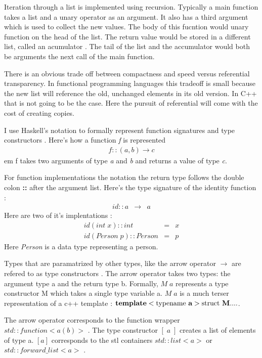 \documentclass[12pt,fleqn]{article}
\begin{document}
Iteration through a list is implemented using recursion.
Typically a main function takes a list and a unary operator as an argument. 
It also has a third argument which is used to collect the new values.
The body of this fucntion would unary function on the head of the list.
The return value would be stored in a different list, called an acumulator \cite{hutton}.
The tail of the list and the accumulator would both be arguments the next call of the main function. 

There is an obvious trade off between compactness and speed versus referential transparency.
In functional programming languages this tradeoff is small because the new list will reference the old, unchanged elements in its old version.
In C++ that is not going to be the case.  Here the pursuit of referential will come with the cost of creating copies. 

I use Haskell's notation to formally represent function signatures and type constructors \cite{hutton}. 
Here's how a function {\em f} is represented  
\begin{eqnarray*}
                              f::(a,b) \rightarrow c
\end{eqnarray*}
{em f} takes two arguments of type {\em a} and {\em b} and returns a value of type {\em c}.
 
For function implementations the notation the return type follows the double colon {\bf ::} after the argument list.
Here's the type signature of the identity function :
\begin{eqnarray*}
id :: a &\rightarrow& a 
\end{eqnarray*}
Here are two of it's implentations :
\begin{eqnarray*}
id (int \; x)::int  &=& x  \\
id (Person \; p)::Person &=& p 
\end{eqnarray*}
Here {\em Person} is a data type representing a person. 

Types that are paramatrized by other types, like the arrow operator $\rightarrow$ are refered to as type constructors \cite{lipovaca}.
The arrow operator takes two types: the argument type a and the return type b.
Formally, $M\;a$ represents a type constructor  M which takes a single type variable a.
$M\;a$ is a much terser representation of a c++ template : 
$ {\bf template}<\mbox{typename {\bf a}}> \mbox{struct {\bf M}} {....}$. 

The arrow operator corresponds to the function wrapper $std::function<a(b)>$ \cite{josuttis}. 
The type constructor $[\;a\;]$ creates a list of elements of type a.
$[a]$ corresponds to the stl containers $std::list<a>$ or $std::forward\_list<a>$ \cite{josuttis}.
\end{document}
